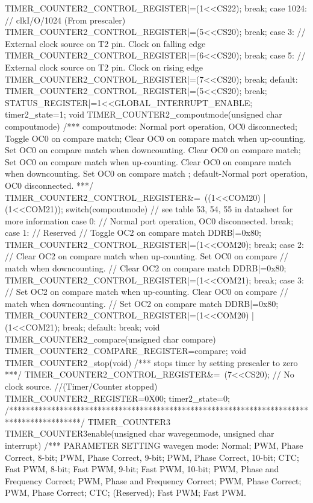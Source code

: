 \begin{verbatimtab}
{{{			TIMER_COUNTER2_CONTROL_REGISTER|=(1<<CS22);
			break;
			case 1024: // clkI/O/1024 (From prescaler)
			TIMER_COUNTER2_CONTROL_REGISTER|=(5<<CS20);
			break;
			case 3: // External clock source on T2 pin. Clock on falling edge
			TIMER_COUNTER2_CONTROL_REGISTER|=(6<<CS20);
			break;
			case 5: // External clock source on T2 pin. Clock on rising edge
			TIMER_COUNTER2_CONTROL_REGISTER|=(7<<CS20);
			break;
			default:
			TIMER_COUNTER2_CONTROL_REGISTER|=(5<<CS20);
			break;
		}
		STATUS_REGISTER|=1<<GLOBAL_INTERRUPT_ENABLE;
		timer2_state=1;
	}	
}
void TIMER_COUNTER2_compoutmode(unsigned char compoutmode)
/***
compoutmode: Normal port operation, OC0 disconnected;
Toggle OC0 on compare match; 
Clear OC0 on compare match when up-counting. Set OC0 on compare match
when downcounting. Clear OC0 on compare match;
Set OC0 on compare match when up-counting. Clear OC0 on compare match
when downcounting. Set OC0 on compare match ;
default-Normal port operation, OC0 disconnected.
***/
{
	TIMER_COUNTER2_CONTROL_REGISTER&=~((1<<COM20) | (1<<COM21));
	switch(compoutmode){ // see table 53, 54, 55 in datasheet for more information
		case 0: // Normal port operation, OC0 disconnected.
		break;
		case 1: // Reserved
		// Toggle OC2 on compare match
		DDRB|=0x80;
		TIMER_COUNTER2_CONTROL_REGISTER|=(1<<COM20);
		break;
		case 2: // Clear OC2 on compare match when up-counting. Set OC0 on compare
		// match when downcounting.
		// Clear OC2 on compare match
		DDRB|=0x80;
		TIMER_COUNTER2_CONTROL_REGISTER|=(1<<COM21);
		break;
		case 3: // Set OC2 on compare match when up-counting. Clear OC0 on compare
		// match when downcounting.
		// Set OC2 on compare match
		DDRB|=0x80;
		TIMER_COUNTER2_CONTROL_REGISTER|=(1<<COM20) | (1<<COM21);
		break;
		default:
		break;
	}
}
void TIMER_COUNTER2_compare(unsigned char compare)
{
	TIMER_COUNTER2_COMPARE_REGISTER=compare;
}
void TIMER_COUNTER2_stop(void)
/***
stops timer by setting prescaler to zero
***/
{
	TIMER_COUNTER2_CONTROL_REGISTER&=~(7<<CS20); // No clock source.
	//(Timer/Counter stopped)
	TIMER_COUNTER2_REGISTER=0X00;
	timer2_state=0;
}
/*****************************************************************************************/
TIMER_COUNTER3 TIMER_COUNTER3enable(unsigned char wavegenmode, unsigned char interrupt)
/***
PARAMETER SETTING
wavegen mode: Normal; PWM, Phase Correct, 8-bit; PWM, Phase Correct, 9-bit;
PWM, Phase Correct, 10-bit;
CTC; Fast PWM, 8-bit; Fast PWM, 9-bit; Fast PWM, 10-bit;
PWM, Phase and Frequency Correct; PWM, Phase and Frequency Correct;
PWM, Phase Correct; PWM, Phase Correct; CTC; (Reserved);
Fast PWM; Fast PWM.

\end{verbatimtab}
